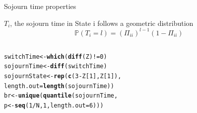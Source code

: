 \documentclass{beamer}\usepackage[]{graphicx}\usepackage[]{color}
\makeatletter
\newcommand{\hlnum}[1]{\textcolor[rgb]{0.686,0.059,0.569}{#1}}%
\newcommand{\hlopt}[1]{\textcolor[rgb]{0,0,0}{#1}}%
\newcommand{\hlstd}[1]{\textcolor[rgb]{0.345,0.345,0.345}{#1}}%
\newcommand{\hlkwb}[1]{\textcolor[rgb]{0.69,0.353,0.396}{#1}}%
\newcommand{\hlkwc}[1]{\textcolor[rgb]{0.333,0.667,0.333}{#1}}%
\newcommand{\hlkwd}[1]{\textcolor[rgb]{0.737,0.353,0.396}{\textbf{#1}}}%
\newenvironment{kframe}{%
 \def\at@end@of@kframe{}%
 \ifinner\ifhmode%
  \def\at@end@of@kframe{\end{minipage}}%
  \begin{minipage}{\columnwidth}%
 \fi\fi%
 \def\FrameCommand##1{\hskip\@totalleftmargin \hskip-\fboxsep
 \colorbox{shadecolor}{##1}\hskip-\fboxsep
     \hskip-\linewidth \hskip-\@totalleftmargin \hskip\columnwidth}%
 \MakeFramed {\advance\hsize-\width
   \@totalleftmargin\z@ \linewidth\hsize
   \@setminipage}}%
 {\par\unskip\endMakeFramed%
 \at@end@of@kframe}
\newenvironment{knitrout}{}{} %
\renewcommand{\P}{\mathbb{P}}
\makeatother
\begin{document}
\begin{frame}[fragile]{Sojourn time properties}


 {\small
  $T_i$, the sojourn time in State i follows a geometric distribution
 $$\P(T_i=l)=(\Pi_{ii})^{l-1}(1-\Pi_{ii})$$
 }


\begin{columns}
\begin{column}{0.5\textwidth}
\begin{knitrout}\tiny
{}\color{fgcolor}\begin{kframe}
\begin{alltt}
\hlstd{switchTime} \hlkwb{<-} \hlkwd{which}\hlstd{(}\hlkwd{diff}\hlstd{(Z)}\hlopt{!=}\hlnum{0}\hlstd{)}
\hlstd{sojournTime} \hlkwb{<-} \hlkwd{diff}\hlstd{(switchTime)}
\hlstd{sojournState} \hlkwb{<-} \hlkwd{rep}\hlstd{(}\hlkwd{c}\hlstd{(}\hlnum{3}\hlopt{-}\hlstd{Z[}\hlnum{1}\hlstd{], Z[}\hlnum{1}\hlstd{]),}
                    \hlkwc{length.out} \hlstd{=} \hlkwd{length}\hlstd{(sojournTime))}
\hlstd{br} \hlkwb{<-} \hlkwd{unique}\hlstd{(}\hlkwd{quantile}\hlstd{(sojournTime,}
                      \hlstd{p}\hlkwb{<-} \hlkwd{seq}\hlstd{(}\hlnum{1}\hlopt{/}\hlstd{N,} \hlnum{1}\hlstd{,} \hlkwc{length.out} \hlstd{=} \hlnum{6}\hlstd{)))}


\end{alltt}
\end{kframe}
\end{knitrout}
\end{column}
\end{columns}
\end{frame}
\end{document}
